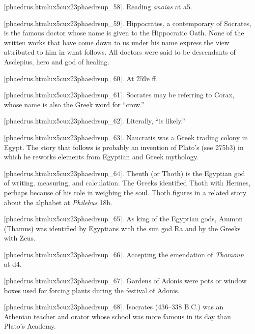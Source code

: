 [phaedrus.htmlux5cux23phaedrsup_58]. Reading {\em anoias} at
a5.

[phaedrus.htmlux5cux23phaedrsup_59]. Hippocrates, a
contemporary of Socrates, is the famous doctor whose name is given to
the Hippocratic Oath. None of the written works that have come down to
us under his name express the view attributed to him in what follows.
All doctors were said to be descendants of Asclepius, hero and god of
healing.

[phaedrus.htmlux5cux23phaedrsup_60]. At 259e ff.

[phaedrus.htmlux5cux23phaedrsup_61]. Socrates may be referring
to Corax, whose name is also the Greek word for “crow.”

[phaedrus.htmlux5cux23phaedrsup_62]. Literally, “is likely.”

[phaedrus.htmlux5cux23phaedrsup_63]. Naucratis was a Greek
trading colony in Egypt. The story that follows is probably an invention
of Plato's (see 275b3) in which he reworks elements from Egyptian and
Greek mythology.

[phaedrus.htmlux5cux23phaedrsup_64]. Theuth (or Thoth) is the
Egyptian god of writing, measuring, and calculation. The Greeks
identified Thoth with Hermes, perhaps because of his role in weighing
the soul. Thoth figures in a related story about the alphabet at
{\em Philebus} 18b.

[phaedrus.htmlux5cux23phaedrsup_65]. As king of the Egyptian
gods, Ammon (Thamus) was identified by Egyptians with the sun god Ra and
by the Greeks with Zeus.

[phaedrus.htmlux5cux23phaedrsup_66]. Accepting the emendation
of {\em Thamoun} at d4.

[phaedrus.htmlux5cux23phaedrsup_67]. Gardens of Adonis were
pots or window boxes used for forcing plants during the festival of
Adonis.

[phaedrus.htmlux5cux23phaedrsup_68]. Isocrates (436--338 B.C.)
was an Athenian teacher and orator whose school was more famous in its
day than Plato's Academy.
